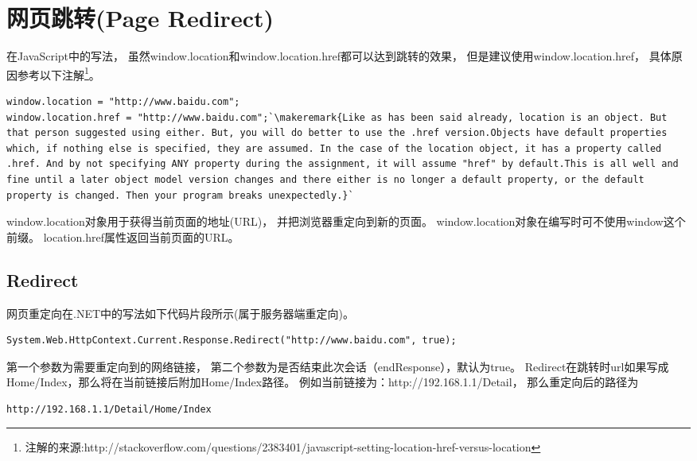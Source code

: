 \documentclass{book}
\newcounter{coderemarks}   %
\newcounter{codevar}     %
\newcommand{\circlemark}[1]{%
\tikz\node[text=white,font=\sffamily\bfseries,inner sep=0.2mm,draw,circle,fill=black]{#1};}
\newcommand{\makeremark}[1]{%
\circlemark{\arabic{coderemarks}}%
\global \expandafter\def \csname codebox\the\value{coderemarks}\endcsname{#1}%
\stepcounter{coderemarks}}
\newcommand{\showremarks}{%
\begin{list}{\circlemark{\arabic{codevar}}} %
{} %
\whiledo{\value{codevar} < \value{coderemarks}}{ %
\item \expandafter\csname codebox\the\value{codevar}\endcsname %
\stepcounter{codevar}} %
\end{list} %
\setcounter{coderemarks}{1}%
\setcounter{codevar}{1}%
}
\begin{document}
\section{网页跳转(Page Redirect)}

在JavaScript中的写法，
虽然window.location和window.location.href都可以达到跳转的效果，
但是建议使用window.location.href，
具体原因参考以下注解\footnote{注解的来源:http://stackoverflow.com/questions/2383401/javascript-setting-location-href-versus-location}。

\begin{lstlisting}[language=VBScript]
window.location = "http://www.baidu.com";
window.location.href = "http://www.baidu.com";`\makeremark{Like as has been said already, location is an object. But that person suggested using either. But, you will do better to use the .href version.Objects have default properties which, if nothing else is specified, they are assumed. In the case of the location object, it has a property called .href. And by not specifying ANY property during the assignment, it will assume "href" by default.This is all well and fine until a later object model version changes and there either is no longer a default property, or the default property is changed. Then your program breaks unexpectedly.}`
\end{lstlisting}

\showremarks

window.location对象用于获得当前页面的地址(URL)，
并把浏览器重定向到新的页面。
window.location对象在编写时可不使用window这个前缀。
location.href属性返回当前页面的URL。

\subsection{Redirect}

网页重定向在.NET中的写法如下代码片段所示(属于服务器端重定向)。

\begin{lstlisting}[language={[Sharp]C}]
System.Web.HttpContext.Current.Response.Redirect("http://www.baidu.com", true);
\end{lstlisting}

第一个参数为需要重定向到的网络链接，
第二个参数为是否结束此次会话（endResponse），默认为true。
Redirect在跳转时url如果写成Home/Index，那么将在当前链接后附加Home/Index路径。
例如当前链接为：http://192.168.1.1/Detail，
那么重定向后的路径为

\begin{lstlisting}[language=HTML]
http://192.168.1.1/Detail/Home/Index
\end{lstlisting}
\end{document}
